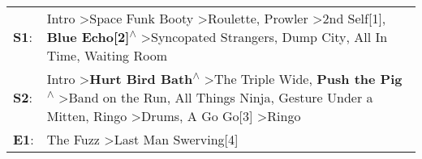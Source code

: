 \begin{supertabular}{p{0.03\textwidth}p{0.92\textwidth}}
 \textbf{S1}:  &                                                                         Intro\textsuperscript{} \textgreater \enspace Space Funk Booty\textsuperscript{} \textgreater \enspace Roulette\textsuperscript{}, \enspace Prowler\textsuperscript{} \textgreater \enspace 2nd Self[1]\textsuperscript{}, \enspace \textbf{Blue Echo[2]\textsuperscript{$\wedge$}} \textgreater \enspace Syncopated Strangers\textsuperscript{}, \enspace Dump City\textsuperscript{}, \enspace All In Time\textsuperscript{}, \enspace Waiting Room\textsuperscript{}  \enspace  \\
 \textbf{S2}:  &  Intro\textsuperscript{} \textgreater \enspace \textbf{Hurt Bird Bath\textsuperscript{$\wedge$}} \textgreater \enspace The Triple Wide\textsuperscript{}, \enspace \textbf{Push the Pig\textsuperscript{$\wedge$}} \textgreater \enspace Band on the Run\textsuperscript{}, \enspace All Things Ninja\textsuperscript{}, \enspace Gesture Under a Mitten\textsuperscript{}, \enspace Ringo\textsuperscript{} \textgreater \enspace Drums\textsuperscript{}, \enspace A Go Go[3]\textsuperscript{} \textgreater \enspace Ringo\textsuperscript{}  \enspace  \\
 \textbf{E1}:  &                                                                                                                                                                                                                                                                                                                                                                                                                                                         The Fuzz\textsuperscript{} \textgreater \enspace Last Man Swerving[4]\textsuperscript{}  \enspace  \\
\end{supertabular}

